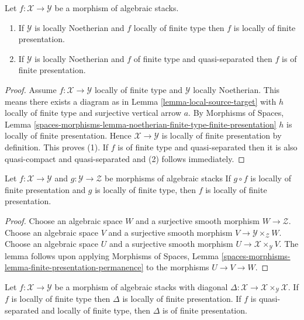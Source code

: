 \begin{lemma}
\label{lemma-noetherian-finite-type-finite-presentation}
Let $f : \mathcal{X} \to \mathcal{Y}$ be a morphism of algebraic stacks.
\begin{enumerate}
\item If $\mathcal{Y}$ is locally Noetherian and $f$ locally of finite type
then $f$ is locally of finite presentation.
\item If $\mathcal{Y}$ is locally Noetherian and $f$ of finite type and
quasi-separated then $f$ is of finite presentation.
\end{enumerate}
\end{lemma}

\begin{proof}
Assume $f : \mathcal{X} \to \mathcal{Y}$
locally of finite type and $\mathcal{Y}$ locally Noetherian.
This means there exists a diagram as in
Lemma \ref{lemma-local-source-target}
with $h$ locally of finite type and surjective vertical arrow $a$. By
Morphisms of Spaces, Lemma
\ref{spaces-morphisms-lemma-noetherian-finite-type-finite-presentation}
$h$ is locally of finite presentation.
Hence $\mathcal{X} \to \mathcal{Y}$
is locally of finite presentation by definition.
This proves (1).
If $f$ is of finite type and quasi-separated then it is also
quasi-compact and quasi-separated and (2) follows immediately.
\end{proof}

\begin{lemma}
\label{lemma-finite-presentation-permanence}
Let $f : \mathcal{X} \to \mathcal{Y}$ and
$g : \mathcal{Y} \to \mathcal{Z}$ be morphisms of algebraic stacks
If $g \circ f$ is locally of finite presentation and $g$ is locally of
finite type, then $f$ is locally of finite presentation.
\end{lemma}

\begin{proof}
Choose an algebraic space $W$ and a surjective smooth morphism
$W \to \mathcal{Z}$.
Choose an algebraic space $V$ and a surjective smooth morphism
$V \to \mathcal{Y} \times_\mathcal{Z} W$.
Choose an algebraic space $U$ and a surjective smooth morphism
$U \to \mathcal{X} \times_\mathcal{Y} V$.
The lemma follows upon applying
Morphisms of Spaces, Lemma
\ref{spaces-morphisms-lemma-finite-presentation-permanence}
to the morphisms $U \to V \to W$.
\end{proof}

\begin{lemma}
\label{lemma-diagonal-morphism-finite-type}
Let $f : \mathcal{X} \to \mathcal{Y}$ be a morphism of algebraic stacks
with diagonal
$\Delta : \mathcal{X} \to \mathcal{X} \times_\mathcal{Y} \mathcal{X}$.
If $f$ is locally of finite type then $\Delta$ is
locally of finite presentation. If $f$ is
quasi-separated and locally of finite type, then $\Delta$ is of finite
presentation.
\end{lemma}

